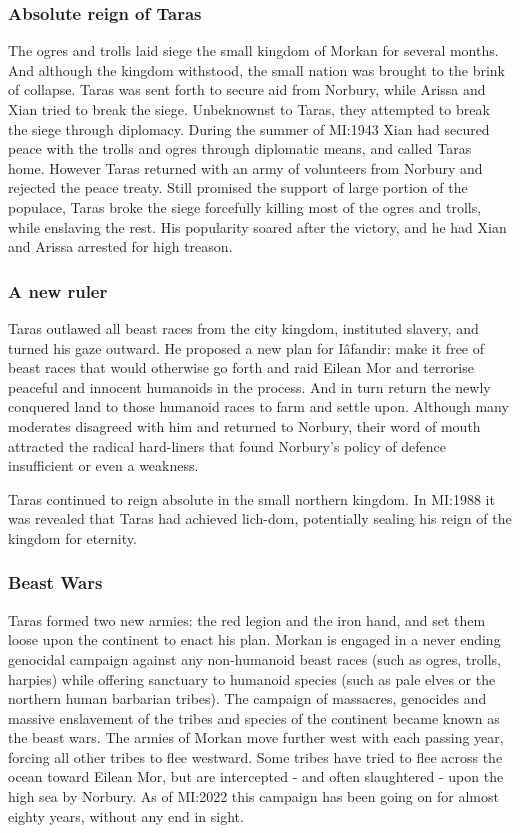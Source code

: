 \subsubsection{Absolute reign of Taras}

The ogres and trolls laid siege the small kingdom of Morkan for several
months. And although the kingdom withstood, the small nation was brought to
the brink of collapse. Taras was sent forth to secure aid from Norbury, while
Arissa and Xian tried to break the siege. Unbeknownst to Taras, they attempted
to break the siege through diplomacy. During the summer of MI:1943 Xian
had secured peace with the trolls and ogres through diplomatic means, and
called Taras home. However Taras returned with an army of volunteers from
Norbury and rejected the peace treaty. Still promised the support of large
portion of the populace, Taras broke the siege forcefully killing most of the
ogres and trolls, while enslaving the rest. His popularity soared after the
victory, and he had Xian and Arissa arrested for high treason.

\subsubsection{A new ruler}

Taras outlawed all beast races from the city kingdom, instituted slavery,
and turned his gaze outward. He proposed a new plan for Iâfandir: make it free
of beast races that would otherwise go forth and raid Eilean Mor and terrorise
peaceful and innocent humanoids in the process. And in turn return the newly
conquered land to those humanoid races to farm and settle upon. Although many
moderates disagreed with him and returned to Norbury, their word of mouth
attracted the radical hard-liners that found Norbury's policy of defence
insufficient or even a weakness.

Taras continued to reign absolute in the small northern kingdom. In MI:1988 it
was revealed that Taras had achieved lich-dom, potentially sealing his reign
of the kingdom for eternity.

\subsubsection{Beast Wars}
\label{sec:Beast Wars}

Taras formed two new armies: the red legion and the
iron hand, and set them loose upon the continent to enact his
plan. Morkan is engaged in a never ending genocidal campaign against any
non-humanoid beast races (such as ogres, trolls, harpies) while offering
sanctuary to humanoid species (such as pale elves or the northern human
barbarian tribes). The campaign of massacres, genocides and massive
enslavement of the tribes and species of the continent became known as the
beast wars. The armies of Morkan move further west with each passing
year, forcing all other tribes to flee westward. Some tribes have tried to
flee across the ocean toward Eilean Mor, but are intercepted - and often
slaughtered - upon the high sea by Norbury. As of MI:2022 this campaign
has been going on for almost eighty years, without any end in sight.

